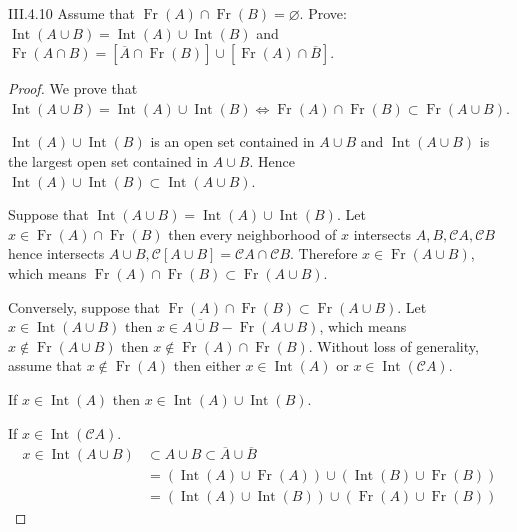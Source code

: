 \begin{problem}{III.4.10}
Assume that \( \operatorname{Fr}(A) \cap \operatorname{Fr}(B) = \varnothing \). Prove: \( \operatorname{Int}(A \cup B) = \operatorname{Int}(A) \cup \operatorname{Int}(B) \) and \( \operatorname{Fr}(A \cap B) = \left[ \overline{A} \cap \operatorname{Fr}(B) \right] \cup \left[ \operatorname{Fr}(A) \cap \overline{B} \right] \).
\end{problem}

\begin{proof}
    We prove that \( \operatorname{Int}(A \cup B) = \operatorname{Int}(A) \cup \operatorname{Int}(B) \iff \operatorname{Fr}(A) \cap \operatorname{Fr}(B) \subset \operatorname{Fr}(A \cup B) \).

    \( \operatorname{Int}(A) \cup \operatorname{Int}(B) \) is an open set contained in \( A \cup B \) and \( \operatorname{Int}(A \cup B) \) is the largest open set contained in \( A \cup B \). Hence \( \operatorname{Int}(A) \cup \operatorname{Int}(B) \subset \operatorname{Int}(A \cup B) \).

    Suppose that \( \operatorname{Int}(A \cup B) = \operatorname{Int}(A) \cup \operatorname{Int}(B) \). Let \( x \in \operatorname{Fr}(A) \cap \operatorname{Fr}(B) \) then every neighborhood of \( x \) intersects \( A, B, \mathscr{C}A, \mathscr{C}B \) hence intersects \( A \cup B, \mathscr{C}\left[A \cup B\right] = \mathscr{C}A \cap \mathscr{C}B \). Therefore \( x \in \operatorname{Fr}(A \cup B) \), which means \( \operatorname{Fr}(A) \cap \operatorname{Fr}(B) \subset \operatorname{Fr}(A \cup B) \).

    Conversely, suppose that \( \operatorname{Fr}(A) \cap \operatorname{Fr}(B) \subset \operatorname{Fr}(A \cup B) \). Let \( x \in \operatorname{Int}(A \cup B) \) then \( x \in \overline{A \cup B} - \operatorname{Fr}(A \cup B) \), which means \( x \notin \operatorname{Fr}(A \cup B) \) then \( x \notin \operatorname{Fr}(A) \cap \operatorname{Fr}(B) \). Without loss of generality, assume that \( x \notin \operatorname{Fr}(A) \) then either \( x \in \operatorname{Int}(A) \) or \( x \in \operatorname{Int}(\mathscr{C}A) \).

    If \( x \in \operatorname{Int}(A) \) then \( x \in \operatorname{Int}(A) \cup \operatorname{Int}(B) \).

    If \( x \in \operatorname{Int}(\mathscr{C}A) \).
    \begingroup
    \allowdisplaybreaks%
    \begin{align*}
        x \in \operatorname{Int}(A \cup B) & \subset A \cup B \subset \overline{A} \cup \overline{B}                                                                          \\
                                           & = \left(\operatorname{Int}(A) \cup \operatorname{Fr}(A)\right) \cup \left(\operatorname{Int}(B) \cup \operatorname{Fr}(B)\right) \\
                                           & = \left(\operatorname{Int}(A) \cup \operatorname{Int}(B)\right) \cup \left(\operatorname{Fr}(A) \cup \operatorname{Fr}(B)\right)
    \end{align*}
    \endgroup


\end{proof}
